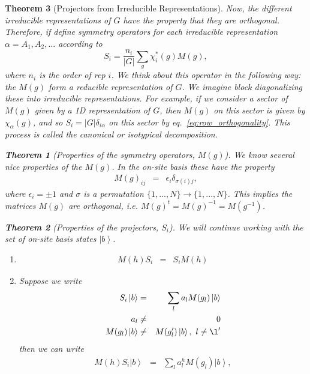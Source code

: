\documentclass{article}
\newcommand{\ket}[1]{\left| #1 \right>} %
\newtheorem{theorem}{Theorem}[section]
\theoremstyle{definition}
\begin{document}
\begin{theorem}[Projectors from Irreducible Representations]
Now, the different irreducible representations of $G$ have the property that they are orthogonal. Therefore, if define symmetry operators for each irreducible representation $\alpha = A_1, A_2, ...$ according to
\begin{equation}
S_i =\frac{n_i}{|G|} \sum_g \chi^*_i(g) M(g),
\end{equation}
where $n_i$ is the order of rep $i$. We think about this operator in the following way: the $M(g)$ form a reducible representation of $G$. We imagine block diagonalizing these into irreducible representations. For example, if we consider a sector of $M(g)$ given by a 1D representation of $G$, then $M(g)$ on this sector is given by $\chi_\alpha(g)$, and so $S_i = |G| \delta_{i\alpha}$ on this sector by eq.~\ref{eq:row_orthogonality}. This process is called the \emph{canonical} or \emph{isotypical} decomposition.

\begin{theorem}[Properties of the symmetry operators, $M(g)$]
We know several nice properties of the $M(g)$. In the on-site basis these have the property
\begin{eqnarray}
M(g)_{ij} &=& \epsilon_i \delta_{\sigma(i) j},
\end{eqnarray}
where $\epsilon_i = \pm 1$ and $\sigma$ is a permutation $\{1, ..., N\} \to \{1, ..., N\}$. This implies the matrices $M(g)$ are orthogonal, i.e. $M(g)^t = M(g)^{-1} = M(g^{-1})$.
\end{theorem}

\begin{theorem}[Properties of the projectors, $S_i$]

We will continue working with the set of on-site basis states $\ket{b}$.

\begin{enumerate}
\item  \begin{eqnarray}
M(h) S_i &=& S_i M(h)
\end{eqnarray}

\item Suppose we write
\begin{eqnarray}
S_i \ket{b} &=& \sum_l a_l M(g_l) \ket{b}\\
a_l &\neq& 0\\
M(g_l)\ket{b} &\neq& M(g_l') \ket{b}, \ l \neq \l'
\end{eqnarray}
then we can write
\begin{eqnarray}
M(h) S_i \ket{b} &=& \sum_l a^h_l M(g_l) \ket{b},
\end{eqnarray}


\end{enumerate}
\end{theorem}
\end{theorem}
\end{document}
